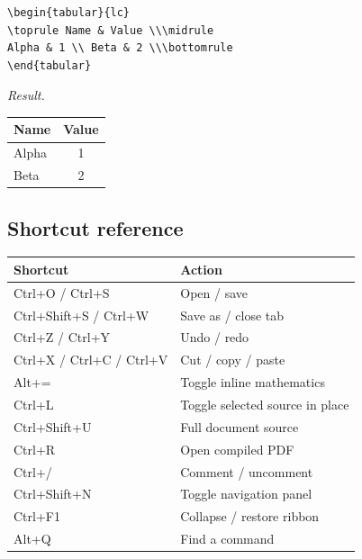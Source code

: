 \documentclass[11pt]{article}
\newcommand{\result}{\par\noindent\textit{Result.}\ }
\begin{document}
\begin{verbatim}
\begin{tabular}{lc}
\toprule Name & Value \\\midrule
Alpha & 1 \\ Beta & 2 \\\bottomrule
\end{tabular}
\end{verbatim}
\result
\begin{center}\begin{tabular}{lc}
\toprule Name&Value\\\midrule Alpha&1\\Beta&2\\\bottomrule
\end{tabular}\end{center}

\subsection{Shortcut reference}
\begin{center}\begin{tabular}{ll}
\toprule Shortcut&Action\\\midrule
Ctrl+O / Ctrl+S&Open / save\\
Ctrl+Shift+S / Ctrl+W&Save as / close tab\\
Ctrl+Z / Ctrl+Y&Undo / redo\\
Ctrl+X / Ctrl+C / Ctrl+V&Cut / copy / paste\\
Alt+=&Toggle inline mathematics\\
Ctrl+L&Toggle selected source in place\\
Ctrl+Shift+U&Full document source\\
Ctrl+R&Open compiled PDF\\
Ctrl+/&Comment / uncomment\\
Ctrl+Shift+N&Toggle navigation panel\\
Ctrl+F1&Collapse / restore ribbon\\
Alt+Q&Find a command\\
\bottomrule\end{tabular}\end{center}
\end{document}
